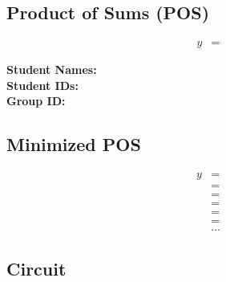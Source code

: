 \documentclass[12pt,a4paper]{report}
\begin{document}
\subsection*{Product of Sums (POS)}

\begin{align*}
	y & = 
\end{align*}

\newpage
\noindent
\textbf{Student Names: } \\
\textbf{Student IDs: } \\
\textbf{Group ID: }

\subsection*{Minimized POS}

\begin{align*}
	y & = \\
	    & = \\
	    & = \\
	    & = \\
	    & = \\
	    & = \\
	    & \ldots
\end{align*}

\subsection*{Circuit}
\end{document}
